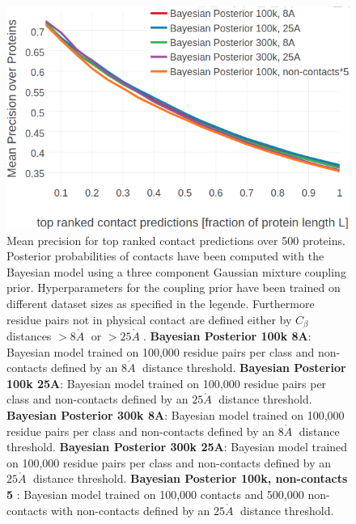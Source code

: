 \documentclass[11pt,a4paper,twoside]{book}
\newcommand{\Cb}{C_\beta}
\newcommand{\angstrom}{\mathring{A} \;}
\theoremstyle{definition}
\theoremstyle{definition}
\theoremstyle{remark}
\begin{document}
\begin{figure}

{\centering \includegraphics[width=0.9\linewidth]{img/bayesian_model/benchmark/precision_vs_rank_pll_3comp_ncthr} 

}

\caption{Mean precision
for top ranked contact predictions over 500 proteins. Posterior
probabilities of contacts have been computed with the Bayesian model
using a three component Gaussian mixture coupling prior. Hyperparameters
for the coupling prior have been trained on different dataset sizes as
specified in the legende. Furthermore residue pairs not in physical
contact are defined either by \(\Cb\) distances \(>8\angstrom\) or
\(>25\angstrom\). \textbf{Bayesian Posterior 100k 8A}: Bayesian model
trained on 100,000 residue pairs per class and non-contacts defined by
an \(8 \angstrom\) distance threshold. \textbf{Bayesian Posterior 100k
25A}: Bayesian model trained on 100,000 residue pairs per class and
non-contacts defined by an \(25 \angstrom\) distance threshold.
\textbf{Bayesian Posterior 300k 8A}: Bayesian model trained on 100,000
residue pairs per class and non-contacts defined by an \(8 \angstrom\)
distance threshold. \textbf{Bayesian Posterior 300k 25A}: Bayesian model
trained on 100,000 residue pairs per class and non-contacts defined by
an \(25 \angstrom\) distance threshold. \textbf{Bayesian Posterior 100k,
non-contacts 5 }: Bayesian model trained on 100,000 contacts and 500,000
non-contacts with non-contacts defined by an \(25 \angstrom\) distance
threshold.}\label{fig:precision-bayesian-model-pll-3comp-ncthr}
\end{figure}
\end{document}
